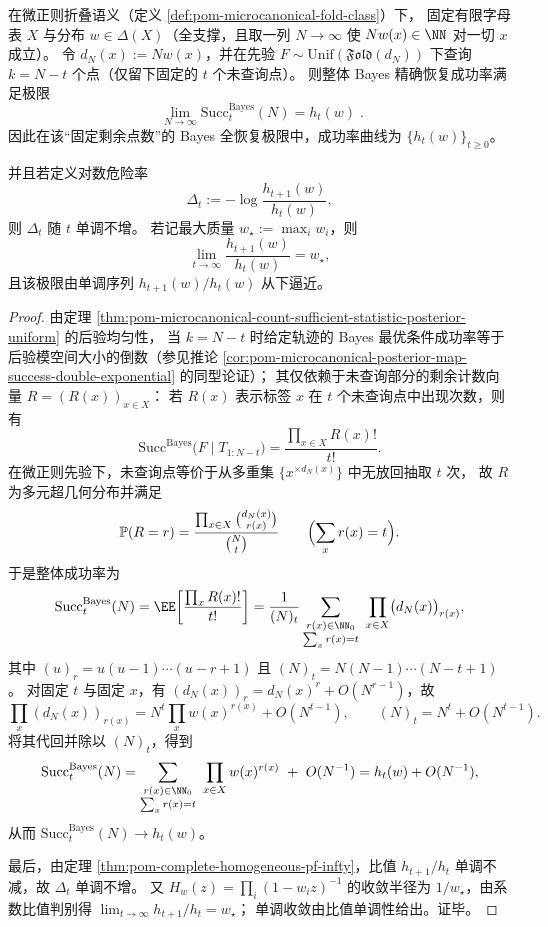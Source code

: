 \begin{corollary}\label{cor:pom-bayes-full-recovery-hazard-monotone}
在微正则折叠语义（定义 \ref{def:pom-microcanonical-fold-class}）下，
固定有限字母表 \(X\) 与分布 \(w\in\Delta(X)\)（全支撑，且取一列 \(N\to\infty\) 使 \(Nw(x)\in\NN\) 对一切 \(x\) 成立）。
令 \(d_N(x):=Nw(x)\)，并在先验 \(F\sim\mathrm{Unif}(\mathfrak{Fold}(d_N))\) 下查询 \(k=N-t\) 个点（仅留下固定的 \(t\) 个未查询点）。
则整体 Bayes 精确恢复成功率满足极限
\[
\boxed{\;
\lim_{N\to\infty}\mathrm{Succ}^{\mathrm{Bayes}}_t(N)=h_t(w)\; }.
\]
因此在该“固定剩余点数”的 Bayes 全恢复极限中，成功率曲线为 \(\{h_t(w)\}_{t\ge0}\)。
\par
并且若定义对数危险率
\[
\Delta_t:=-\log\frac{h_{t+1}(w)}{h_t(w)},
\]
则 \(\Delta_t\) 随 \(t\) 单调不增。
若记最大质量 \(w_\star:=\max_i w_i\)，则
\[
\lim_{t\to\infty}\frac{h_{t+1}(w)}{h_t(w)}=w_\star,
\]
且该极限由单调序列 \(h_{t+1}(w)/h_t(w)\) 从下逼近。
\end{corollary}
\begin{proof}
由定理 \ref{thm:pom-microcanonical-count-sufficient-statistic-posterior-uniform} 的后验均匀性，
当 \(k=N-t\) 时给定轨迹的 Bayes 最优条件成功率等于后验模空间大小的倒数（参见推论 \ref{cor:pom-microcanonical-posterior-map-success-double-exponential} 的同型论证）；
其仅依赖于未查询部分的剩余计数向量 \(R=(R(x))_{x\in X}\)：
若 \(R(x)\) 表示标签 \(x\) 在 \(t\) 个未查询点中出现次数，则有
\[
\mathrm{Succ}^{\mathrm{Bayes}}\bigl(F\mid T_{1:N-t}\bigr)=\frac{\prod_{x\in X}R(x)!}{t!}.
\]
在微正则先验下，未查询点等价于从多重集 \(\{x^{\times d_N(x)}\}\) 中无放回抽取 \(t\) 次，
故 \(R\) 为多元超几何分布并满足
\[
\mathbb{P}(R=r)=\frac{\prod_{x\in X}\binom{d_N(x)}{r(x)}}{\binom{N}{t}}
\qquad\Bigl(\sum_x r(x)=t\Bigr).
\]
于是整体成功率为
\[
\mathrm{Succ}^{\mathrm{Bayes}}_t(N)
=\EE\!\left[\frac{\prod_x R(x)!}{t!}\right]
=\frac{1}{(N)_t}\sum_{\substack{r(x)\in\NN_0\\ \sum_x r(x)=t}}\ \prod_{x\in X}\bigl(d_N(x)\bigr)_{r(x)},
\]
其中 \((u)_r=u(u-1)\cdots(u-r+1)\) 且 \((N)_t=N(N-1)\cdots(N-t+1)\)。
对固定 \(t\) 与固定 \(x\)，有 \((d_N(x))_{r}=d_N(x)^{r}+O(N^{r-1})\)，故
\[
\prod_x (d_N(x))_{r(x)}
=N^{t}\prod_x w(x)^{r(x)}+O(N^{t-1}),
\qquad
(N)_t=N^{t}+O(N^{t-1}).
\]
将其代回并除以 \((N)_t\)，得到
\[
\mathrm{Succ}^{\mathrm{Bayes}}_t(N)
=\sum_{\substack{r(x)\in\NN_0\\ \sum_x r(x)=t}}\ \prod_{x\in X} w(x)^{r(x)}\ +\ O(N^{-1})
=h_t(w)+O(N^{-1}),
\]
从而 \(\mathrm{Succ}^{\mathrm{Bayes}}_t(N)\to h_t(w)\)。
\par
最后，由定理 \ref{thm:pom-complete-homogeneous-pf-infty}，比值 \(h_{t+1}/h_t\) 单调不减，故 \(\Delta_t\) 单调不增。
又 \(H_w(z)=\prod_i(1-w_i z)^{-1}\) 的收敛半径为 \(1/w_\star\)，由系数比值判别得 \(\lim_{t\to\infty}h_{t+1}/h_t=w_\star\)；
单调收敛由比值单调性给出。证毕。
\end{proof}

